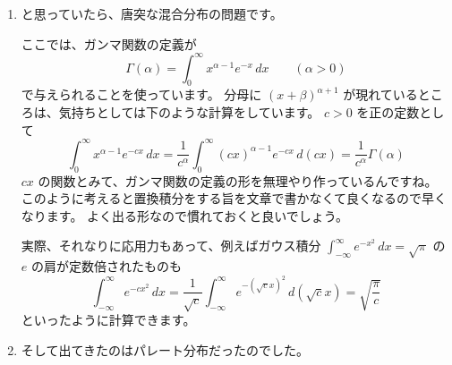\documentclass[./main.tex]{subfiles}
\begin{document}
\begin{enumerate}
        \item と思っていたら、唐突な混合分布の問題です。

        ここでは、ガンマ関数の定義が
        \begin{equation}
            \Gamma (\alpha) 
                = \int_0^\infty x^{\alpha - 1} e^{-x} \, dx
                \qquad (\alpha > 0)
        \end{equation}
        で与えられることを使っています。
        分母に $(x + \beta)^{\alpha + 1}$ が現れているところは、気持ちとしては下のような計算をしています。
        $c > 0$ を正の定数として
        \begin{equation*}
            \int_0^\infty x^{\alpha - 1} e^{-cx} \, dx
                = \frac{1}{c^\alpha} \int_0^\infty (cx)^{\alpha - 1} e^{-cx} \, d(cx)
                = \frac{1}{c^\alpha} \Gamma (\alpha)
        \end{equation*}
        $cx$ の関数とみて、ガンマ関数の定義の形を無理やり作っているんですね。
        このように考えると置換積分をする旨を文章で書かなくて良くなるので早くなります。
        よく出る形なので慣れておくと良いでしょう。
        
        実際、それなりに応用力もあって、例えばガウス積分 $\displaystyle \int_{-\infty}^\infty e^{-x^2} \, dx = \sqrt{\pi}$ の $e$ の肩が定数倍されたものも
        \begin{equation*}
            \int_{-\infty}^\infty e^{-cx^2} \, dx
                = \frac{1}{\sqrt{c}} \int_{-\infty}^\infty e^{-(\sqrt{c} x )^2} \, d(\sqrt{c}x)
                = \sqrt{ \frac{\pi}{c}}
        \end{equation*}
        といったように計算できます。


        \item そして出てきたのはパレート分布だったのでした。

        
    \end{enumerate}
\end{document}
